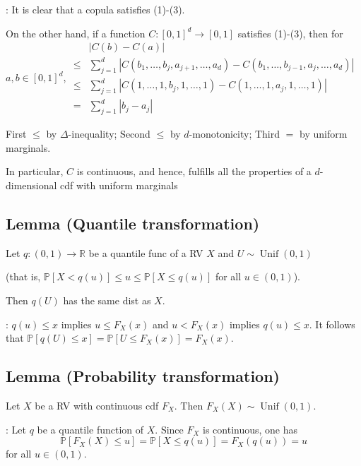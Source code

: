 : It is clear that a copula satisfies (1)-(3).

On the other hand, if a function $C:[0,1]^{d} \rightarrow[0,1]$ satisfies (1)-(3), then for $a, b \in[0,1]^{d}$,
$
\begin{aligned}
 & |C(b)-C(a)| \\
\leq& \sum_{j=1}^{d}\left|C\left(b_{1}, \ldots, b_{j}, a_{j+1}, \ldots, a_{d}\right)-C\left(b_{1}, \ldots, b_{j-1}, a_{j}, \ldots, a_{d}\right)\right|\\
\leq& \sum_{j=1}^{d}\left|C\left(1, \ldots, 1, b_{j}, 1, \ldots, 1\right)-C\left(1, \ldots, 1, a_{j}, 1, \ldots, 1\right)\right|\\
=& \sum_{j=1}^{d}\left|b_{j}-a_{j}\right|
\end{aligned}
$

First $\leq$ by $\Delta$-inequality; Second $\leq$ by $d$-monotonicity; Third $=$ by uniform marginals.

In particular, $C$ is continuous, and hence, fulfills all the properties of a $d$-dimensional cdf with uniform marginals






\subsection*{Lemma (Quantile transformation)}
Let $q:(0,1) \rightarrow \mathbb{R}$ be a quantile func of a RV $X$ and $U \sim \operatorname{Unif}(0,1)$ 

(that is, $\mathbb{P}[X<q(u)] \leq u \leq \mathbb{P}[X \leq q(u)]$ for all $u \in(0,1)$).

Then $q(U)$ has the same dist as $X$.

: $q(u) \leq x$ implies $u \leq F_{X}(x)$ and $u<F_{X}(x)$ implies $q(u) \leq x$. It follows that $\mathbb{P}[q(U) \leq x]=\mathbb{P}\left[U \leq F_{X}(x)\right]=F_{X}(x)$.






\subsection*{Lemma (Probability transformation)}
Let $X$ be a RV with continuous cdf $F_{X}$. Then $F_{X}(X) \sim \operatorname{Unif}(0,1)$.

: Let $q$ be a quantile function of $X$. Since $F_{X}$ is continuous, one has
$$
\mathbb{P}\left[F_{X}(X) \leq u\right]=\mathbb{P}[X \leq q(u)]=F_{X}(q(u))=u
$$
for all $u \in(0,1)$.

